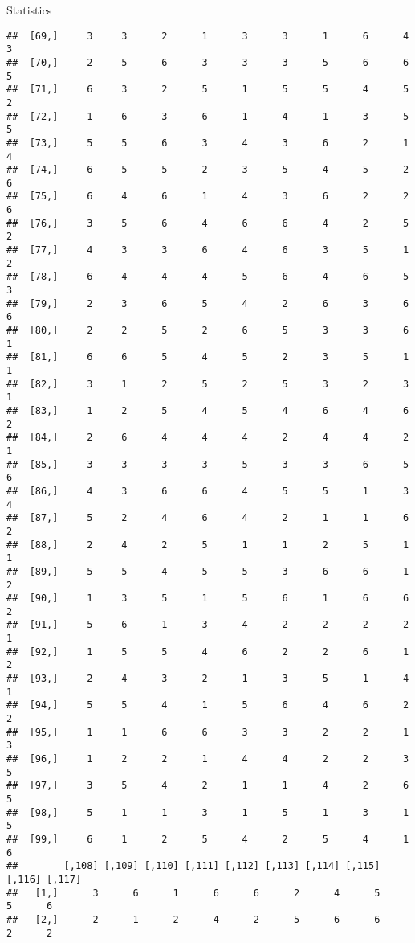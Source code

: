 \documentclass[
  ignorenonframetext,
]{beamer}
\begin{document}
\begin{frame}[fragile]{Statistics}
\begin{verbatim}
##  [69,]     3     3      2      1      3      3      1      6      4      3
##  [70,]     2     5      6      3      3      3      5      6      6      5
##  [71,]     6     3      2      5      1      5      5      4      5      2
##  [72,]     1     6      3      6      1      4      1      3      5      5
##  [73,]     5     5      6      3      4      3      6      2      1      4
##  [74,]     6     5      5      2      3      5      4      5      2      6
##  [75,]     6     4      6      1      4      3      6      2      2      6
##  [76,]     3     5      6      4      6      6      4      2      5      2
##  [77,]     4     3      3      6      4      6      3      5      1      2
##  [78,]     6     4      4      4      5      6      4      6      5      3
##  [79,]     2     3      6      5      4      2      6      3      6      6
##  [80,]     2     2      5      2      6      5      3      3      6      1
##  [81,]     6     6      5      4      5      2      3      5      1      1
##  [82,]     3     1      2      5      2      5      3      2      3      1
##  [83,]     1     2      5      4      5      4      6      4      6      2
##  [84,]     2     6      4      4      4      2      4      4      2      1
##  [85,]     3     3      3      3      5      3      3      6      5      6
##  [86,]     4     3      6      6      4      5      5      1      3      4
##  [87,]     5     2      4      6      4      2      1      1      6      2
##  [88,]     2     4      2      5      1      1      2      5      1      1
##  [89,]     5     5      4      5      5      3      6      6      1      2
##  [90,]     1     3      5      1      5      6      1      6      6      2
##  [91,]     5     6      1      3      4      2      2      2      2      1
##  [92,]     1     5      5      4      6      2      2      6      1      2
##  [93,]     2     4      3      2      1      3      5      1      4      1
##  [94,]     5     5      4      1      5      6      4      6      2      2
##  [95,]     1     1      6      6      3      3      2      2      1      3
##  [96,]     1     2      2      1      4      4      2      2      3      5
##  [97,]     3     5      4      2      1      1      4      2      6      5
##  [98,]     5     1      1      3      1      5      1      3      1      5
##  [99,]     6     1      2      5      4      2      5      4      1      6
##        [,108] [,109] [,110] [,111] [,112] [,113] [,114] [,115] [,116] [,117]
##   [1,]      3      6      1      6      6      2      4      5      5      6
##   [2,]      2      1      2      4      2      5      6      6      2      2

\end{verbatim}
\end{frame}
\end{document}
